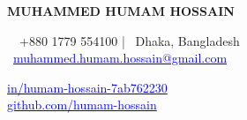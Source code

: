 \vspace*{0.5em}
{\noindent\fontsize{28pt}{34pt}\bfseries MUHAMMED HUMAM HOSSAIN\par}
\vspace{1em}
\noindent
\begin{minipage}[t]{0.55\textwidth}
    \raggedright
    \faMobile\ \ +880 1779 554100 | \faMapMarker \ Dhaka, Bangladesh \\[0.5em]
    \faEnvelope\ \href{mailto:muhammed.humam.hossain@gmail.com}{\textcolor{blue}{muhammed.humam.hossain@gmail.com}}
\end{minipage}%
\hfill
\begin{minipage}[t]{0.43\textwidth}
    \raggedleft
    \href{https://www.linkedin.com/in/humam-hossain-7ab762230/}{\textcolor{blue}{in/humam-hossain-7ab762230}} \faLinkedin\\[0.5em]
    \href{https://github.com/humam-hossain}{\textcolor{blue}{github.com/humam-hossain}} \faGithub\
\end{minipage}
\vspace{2.5em}
